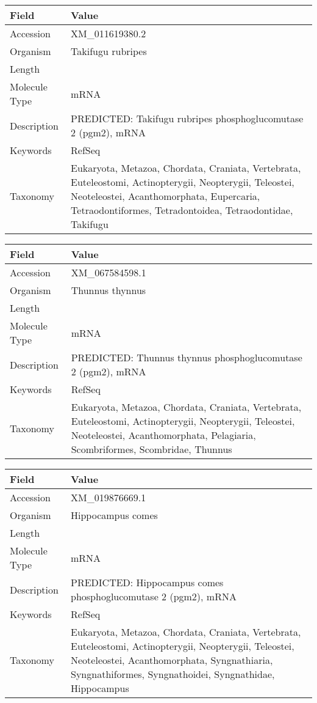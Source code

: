\documentclass[10pt]{article}
\begin{document}
\vspace{1em}
{\footnotesize
\begin{longtable}{>{\raggedright\arraybackslash}p{4.5cm} >{\raggedright\arraybackslash}p{11.5cm}}
\textbf{Field} & \textbf{Value} \\
\hline
Accession & XM\_011619380.2 \\
Organism & Takifugu rubripes \\
Length & 2812 \\
Molecule Type & mRNA \\
Description & PREDICTED: Takifugu rubripes phosphoglucomutase 2 (pgm2), mRNA \\
Keywords & RefSeq \\
Taxonomy & Eukaryota, Metazoa, Chordata, Craniata, Vertebrata, Euteleostomi, Actinopterygii, Neopterygii, Teleostei, Neoteleostei, Acanthomorphata, Eupercaria, Tetraodontiformes, Tetradontoidea, Tetraodontidae, Takifugu \\
\end{longtable}
}

\vspace{1em}
{\footnotesize
\begin{longtable}{>{\raggedright\arraybackslash}p{4.5cm} >{\raggedright\arraybackslash}p{11.5cm}}
\textbf{Field} & \textbf{Value} \\
\hline
Accession & XM\_067584598.1 \\
Organism & Thunnus thynnus \\
Length & 2934 \\
Molecule Type & mRNA \\
Description & PREDICTED: Thunnus thynnus phosphoglucomutase 2 (pgm2), mRNA \\
Keywords & RefSeq \\
Taxonomy & Eukaryota, Metazoa, Chordata, Craniata, Vertebrata, Euteleostomi, Actinopterygii, Neopterygii, Teleostei, Neoteleostei, Acanthomorphata, Pelagiaria, Scombriformes, Scombridae, Thunnus \\
\end{longtable}
}

\vspace{1em}
{\footnotesize
\begin{longtable}{>{\raggedright\arraybackslash}p{4.5cm} >{\raggedright\arraybackslash}p{11.5cm}}
\textbf{Field} & \textbf{Value} \\
\hline
Accession & XM\_019876669.1 \\
Organism & Hippocampus comes \\
Length & 2347 \\
Molecule Type & mRNA \\
Description & PREDICTED: Hippocampus comes phosphoglucomutase 2 (pgm2), mRNA \\
Keywords & RefSeq \\
Taxonomy & Eukaryota, Metazoa, Chordata, Craniata, Vertebrata, Euteleostomi, Actinopterygii, Neopterygii, Teleostei, Neoteleostei, Acanthomorphata, Syngnathiaria, Syngnathiformes, Syngnathoidei, Syngnathidae, Hippocampus \\
\end{longtable}
}
\end{document}
